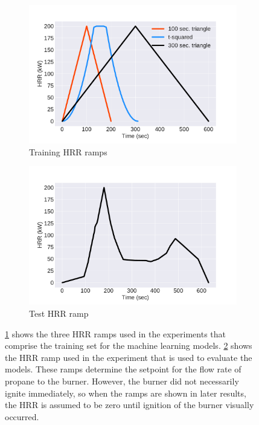 \documentclass{article}
\begin{document}
\begin{figure}[htbp]
  \centering
  \begin{subfigure}[t]{.45\textwidth}
      \centering
      \includegraphics[width=\textwidth,keepaspectratio]{figures/training_ramps.pdf}
      \caption{Training HRR ramps}
      \label{fig:training_ramps}
  \end{subfigure}
  \begin{subfigure}[t]{.45\textwidth}
      \centering
      \includegraphics[width=\textwidth ,keepaspectratio]{figures/test_ramp.pdf}
      \caption{Test HRR ramp}
      \label{fig:test_ramp}
  \end{subfigure}
  \caption{\protect\ref{fig:training_ramps} shows the three HRR ramps used in the experiments that comprise the training set for the machine learning models. \protect\ref{fig:test_ramp} shows the HRR ramp used in the experiment that is used to evaluate the models. These ramps determine the setpoint for the flow rate of propane to the burner. However, the burner did not necessarily ignite immediately, so when the ramps are shown in later results, the HRR is assumed to be zero until ignition of the burner visually occurred. }
  \label{fig:hrr_ramps}
\end{figure}
\end{document}
